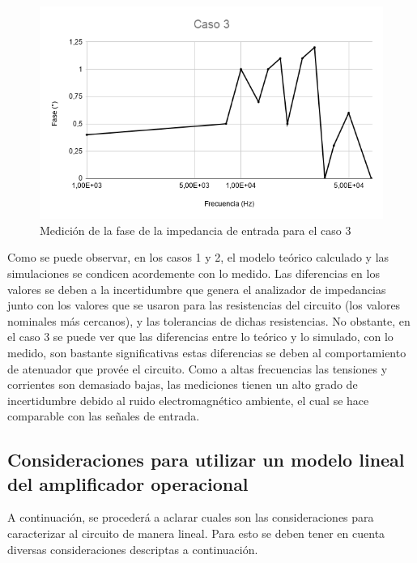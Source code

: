 \begin{figure}[H]
\begin{centering}
\includegraphics[scale=0.5]{../Ex1/iA/Resources1a/zinpp3_med}
\par\end{centering}
\caption{Medición de la fase de la impedancia de entrada para el caso 3}

\end{figure}

Como se puede observar, en los casos 1 y 2, el modelo teórico calculado
y las simulaciones se condicen acordemente con lo medido. Las diferencias
en los valores se deben a la incertidumbre que genera el analizador
de impedancias junto con los valores que se usaron para las resistencias
del circuito (los valores nominales más cercanos), y las tolerancias
de dichas resistencias. No obstante, en el caso 3 se puede ver que
las diferencias entre lo teórico y lo simulado, con lo medido, son
bastante significativas estas diferencias se deben al comportamiento
de atenuador que provée el circuito. Como a altas frecuencias las
tensiones y corrientes son demasiado bajas, las mediciones tienen
un alto grado de incertidumbre debido al ruido electromagnético ambiente,
el cual se hace comparable con las señales de entrada.

\subsection{Consideraciones para utilizar un modelo lineal del amplificador operacional}

A continuación, se procederá a aclarar cuales son las consideraciones
para caracterizar al circuito de manera lineal. Para esto se deben
tener en cuenta diversas consideraciones descriptas a continuación.

